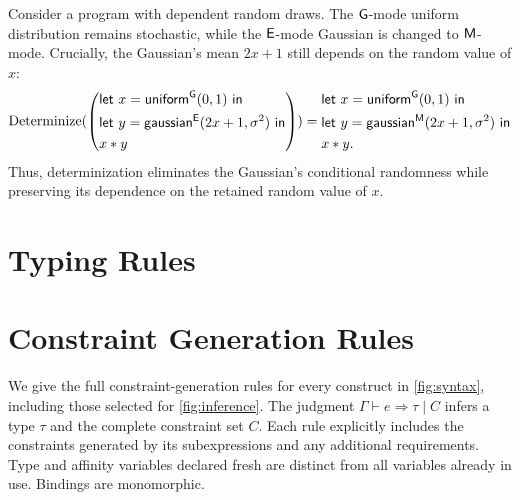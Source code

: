 \begin{example}
Consider a program with dependent random draws.
The $\mathsf{G}$-mode uniform distribution remains stochastic,
while the $\mathsf{E}$-mode Gaussian is changed to $\mathsf{M}$-mode.
Crucially, the Gaussian's mean $2x+1$ still depends
on the random value of $x$:
\[
\operatorname{Determinize}(\left(
\begin{aligned}
&\mathsf{let}\ x=\mathsf{uniform}^{\mathsf{G}}(0,1)\ \mathsf{in}\\
&\mathsf{let}\ y=\mathsf{gaussian}^{\mathsf{E}}(2x+1,\sigma^2)\ \mathsf{in}\\
&x*y
\end{aligned}
\right))
=
\begin{aligned}
&\mathsf{let}\ x=\mathsf{uniform}^{\mathsf{G}}(0,1)\ \mathsf{in}\\
&\mathsf{let}\ y=\mathsf{gaussian}^{\mathsf{M}}(2x+1,\sigma^2)\ \mathsf{in}\\
&x*y.
\end{aligned}
\]
Thus, determinization eliminates the Gaussian's
conditional randomness while preserving its dependence
on the retained random value of $x$.
\end{example}

\section{Typing Rules}
\label{sec:appendix-typing}



\section{Constraint Generation Rules}
\label{sec:appendix-constraint-generation}

We give the full constraint-generation rules for every construct in
\cref{fig:syntax}, including those selected for \cref{fig:inference}.
The judgment $\Gamma\vdash e\Rightarrow\tau\mid C$ infers a type $\tau$
and the complete constraint set $C$. Each rule explicitly includes the
constraints generated by its subexpressions and any additional requirements.
Type and affinity variables declared fresh are distinct from all variables
already in use. Bindings are monomorphic.

